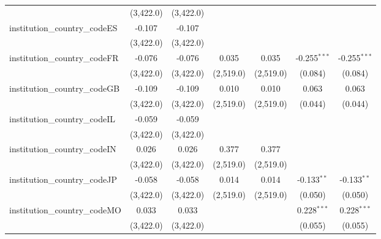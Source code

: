 \begin{tabular}{lcccccc}
                                         & (3,422.0)      & (3,422.0)      &               &               &                &   \\   
   institution\_country\_codeES          & -0.107         & -0.107         &               &               &                &   \\   
                                         & (3,422.0)      & (3,422.0)      &               &               &                &   \\   
   institution\_country\_codeFR          & -0.076         & -0.076         & 0.035         & 0.035         & -0.255$^{***}$ & -0.255$^{***}$\\   
                                         & (3,422.0)      & (3,422.0)      & (2,519.0)     & (2,519.0)     & (0.084)        & (0.084)\\   
   institution\_country\_codeGB          & -0.109         & -0.109         & 0.010         & 0.010         & 0.063          & 0.063\\   
                                         & (3,422.0)      & (3,422.0)      & (2,519.0)     & (2,519.0)     & (0.044)        & (0.044)\\   
   institution\_country\_codeIL          & -0.059         & -0.059         &               &               &                &   \\   
                                         & (3,422.0)      & (3,422.0)      &               &               &                &   \\   
   institution\_country\_codeIN          & 0.026          & 0.026          & 0.377         & 0.377         &                &   \\   
                                         & (3,422.0)      & (3,422.0)      & (2,519.0)     & (2,519.0)     &                &   \\   
   institution\_country\_codeJP          & -0.058         & -0.058         & 0.014         & 0.014         & -0.133$^{**}$  & -0.133$^{**}$\\   
                                         & (3,422.0)      & (3,422.0)      & (2,519.0)     & (2,519.0)     & (0.050)        & (0.050)\\   
   institution\_country\_codeMO          & 0.033          & 0.033          &               &               & 0.228$^{***}$  & 0.228$^{***}$\\   
                                         & (3,422.0)      & (3,422.0)      &               &               & (0.055)        & (0.055)\\   

\end{tabular}
